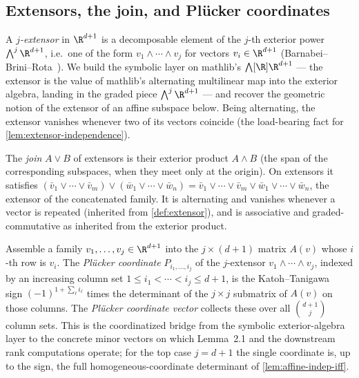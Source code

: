 \subsection{Extensors, the join, and Plücker coordinates}
\label{sec:molecular-extensor}

\begin{definition}[Extensor]
  \label{def:extensor}
  \leanok
  A \emph{$j$-extensor} in $\R^{d+1}$ is a decomposable element of the
  $j$-th exterior power $\bigwedge^{j} \R^{d+1}$, i.e.\ one of the form
  $v_1 \wedge \cdots \wedge v_j$ for vectors $v_i \in \R^{d+1}$
  (Barnabei--Brini--Rota~\cite{barnabeiBriniRota1985}). We build the
  symbolic layer on mathlib's $\bigwedge[\R] \R^{d+1}$ --- the extensor is
  the value of mathlib's alternating multilinear map into the exterior
  algebra, landing in the graded piece $\bigwedge^{j} \R^{d+1}$ --- and
  recover the geometric notion of the
  extensor of an affine subspace below. Being alternating, the extensor
  vanishes whenever two of its vectors coincide (the load-bearing fact for
  \cref{lem:extensor-independence}).
\end{definition}

\begin{definition}[Join]
  \label{def:join}
  \leanok
  The \emph{join} $A \vee B$ of extensors is their exterior product
  $A \wedge B$ (the span of the corresponding subspaces, when they meet
  only at the origin). On extensors it satisfies
  $(\bar v_1 \vee \cdots \vee \bar v_m) \vee (\bar w_1 \vee \cdots \vee \bar w_n)
   = \bar v_1 \vee \cdots \vee \bar v_m \vee \bar w_1 \vee \cdots \vee \bar w_n$,
  the extensor of the concatenated family. It is alternating and vanishes
  whenever a vector is repeated (inherited from \cref{def:extensor}), and is
  associative and graded-commutative as inherited from the exterior product.
\end{definition}

\begin{definition}
  \label{def:plucker-coords}
  \leanok
  Assemble a family $v_1, \dots, v_j \in \R^{d+1}$ into the
  $j \times (d+1)$ matrix $A(v)$ whose $i$-th row is $v_i$. The
  \emph{Plücker coordinate} $P_{i_1, \dots, i_j}$ of the $j$-extensor
  $v_1 \wedge \cdots \wedge v_j$, indexed by an increasing column set
  $1 \le i_1 < \cdots < i_j \le d+1$, is the
  Katoh--Tanigawa~\cite[\S2.1]{katohTanigawa2011} sign
  $(-1)^{1 + \sum_\ell i_\ell}$ times the determinant of the
  $j \times j$ submatrix of $A(v)$ on those columns. The \emph{Plücker
  coordinate vector} collects these over all $\binom{d+1}{j}$ column
  sets. This is the coordinatized bridge from the symbolic
  exterior-algebra layer to the concrete minor vectors on which
  Lemma~2.1 and the downstream rank computations operate; for the top
  case $j = d+1$ the single coordinate is, up to the sign, the full
  homogeneous-coordinate determinant of \cref{lem:affine-indep-iff}.
\end{definition}

